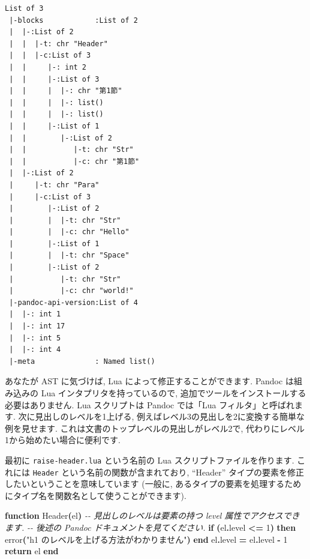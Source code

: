 \documentclass[
  11pt,
  lualatex,
  ja=standard]{bxjsreport}
\newenvironment{Shaded}{\begin{snugshade}}{\end{snugshade}}
\newcommand{\CommentTok}[1]{\textcolor[rgb]{0.56,0.35,0.01}{\textit{#1}}}
\newcommand{\ControlFlowTok}[1]{\textcolor[rgb]{0.13,0.29,0.53}{\textbf{#1}}}
\newcommand{\DecValTok}[1]{\textcolor[rgb]{0.00,0.00,0.81}{#1}}
\newcommand{\FunctionTok}[1]{\textcolor[rgb]{0.00,0.00,0.00}{#1}}
\newcommand{\KeywordTok}[1]{\textcolor[rgb]{0.13,0.29,0.53}{\textbf{#1}}}
\newcommand{\NormalTok}[1]{#1}
\newcommand{\OperatorTok}[1]{\textcolor[rgb]{0.81,0.36,0.00}{\textbf{#1}}}
\newcommand{\StringTok}[1]{\textcolor[rgb]{0.31,0.60,0.02}{#1}}
\begin{document}
\begin{verbatim}
List of 3
 |-blocks            :List of 2
 |  |-:List of 2
 |  |  |-t: chr "Header"
 |  |  |-c:List of 3
 |  |     |-: int 2
 |  |     |-:List of 3
 |  |     |  |-: chr "第1節"
 |  |     |  |-: list()
 |  |     |  |-: list()
 |  |     |-:List of 1
 |  |        |-:List of 2
 |  |           |-t: chr "Str"
 |  |           |-c: chr "第1節"
 |  |-:List of 2
 |     |-t: chr "Para"
 |     |-c:List of 3
 |        |-:List of 2
 |        |  |-t: chr "Str"
 |        |  |-c: chr "Hello"
 |        |-:List of 1
 |        |  |-t: chr "Space"
 |        |-:List of 2
 |           |-t: chr "Str"
 |           |-c: chr "world!"
 |-pandoc-api-version:List of 4
 |  |-: int 1
 |  |-: int 17
 |  |-: int 5
 |  |-: int 4
 |-meta              : Named list()
\end{verbatim}

あなたが AST に気づけば, Lua によって修正することができます. Pandoc は組み込みの Lua インタプリタを持っているので, 追加でツールをインストールする必要はありません. Lua スクリプトは Pandoc では「Lua フィルタ」と呼ばれます. 次に見出しのレベルを1上げる, 例えばレベル3の見出しを2に変換する簡単な例を見せます. これは文書のトップレベルの見出しがレベル2で, 代わりにレベル1から始めたい場合に便利です.

最初に \texttt{raise-header.lua} という名前の Lua スクリプトファイルを作ります. これには \texttt{Header} という名前の関数が含まれており, ``Header'' タイプの要素を修正したいということを意味しています (一般に, あるタイプの要素を処理するためにタイプ名を関数名として使うことができます).

\begin{Shaded}
\begin{Highlighting}[numbers=left,,]
\KeywordTok{function}\NormalTok{ Header}\OperatorTok{(}\NormalTok{el}\OperatorTok{)}
  \CommentTok{{-}{-} 見出しのレベルは要素の持つ \textquotesingle{}level\textquotesingle{} 属性でアクセスできます.}
  \CommentTok{{-}{-} 後述の Pandoc ドキュメントを見てください.}
  \ControlFlowTok{if} \OperatorTok{(}\NormalTok{el}\OperatorTok{.}\NormalTok{level }\OperatorTok{\textless{}=} \DecValTok{1}\OperatorTok{)} \ControlFlowTok{then}
    \FunctionTok{error}\OperatorTok{(}\StringTok{"h1 のレベルを上げる方法がわかりません"}\OperatorTok{)}
  \ControlFlowTok{end}
\NormalTok{  el}\OperatorTok{.}\NormalTok{level }\OperatorTok{=}\NormalTok{ el}\OperatorTok{.}\NormalTok{level }\OperatorTok{{-}} \DecValTok{1}
  \ControlFlowTok{return}\NormalTok{ el}
\KeywordTok{end}
\end{Highlighting}
\end{Shaded}
\end{document}
